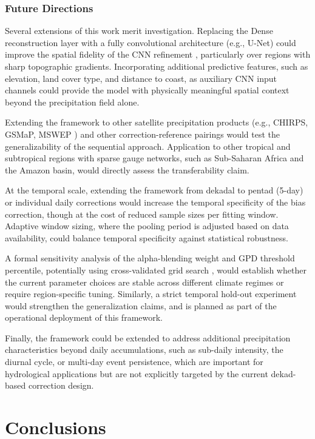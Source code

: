 \documentclass[remotesensing,article,submit,pdftex,moreauthors]{Definitions/mdpi}
\begin{document}
\subsubsection{Future Directions}\label{future-directions}

Several extensions of this work merit investigation. Replacing the Dense
reconstruction layer with a fully convolutional architecture (e.g.,
U-Net) could improve the spatial fidelity of the CNN refinement
\cite{ref40,ref41}, particularly over regions with sharp topographic gradients.
Incorporating additional predictive features, such as elevation, land
cover type, and distance to coast, as auxiliary CNN input channels could
provide the model with physically meaningful spatial context beyond the
precipitation field alone.

Extending the framework to other satellite precipitation products (e.g.,
CHIRPS, GSMaP, MSWEP \cite{ref42}) and other correction-reference pairings
would test the generalizability of the sequential approach. Application
to other tropical and subtropical regions with sparse gauge networks,
such as Sub-Saharan Africa and the Amazon basin, would directly assess
the transferability claim.

At the temporal scale, extending the framework from dekadal to pentad
(5-day) or individual daily corrections would increase the temporal
specificity of the bias correction, though at the cost of reduced sample
sizes per fitting window. Adaptive window sizing, where the pooling
period is adjusted based on data availability, could balance temporal
specificity against statistical robustness.

A formal sensitivity analysis of the alpha-blending weight and GPD
threshold percentile, potentially using cross-validated grid search
\cite{ref43}, would establish whether the current parameter choices are
stable across different climate regimes or require region-specific
tuning. Similarly, a strict temporal hold-out experiment would
strengthen the generalization claims, and is planned as part of the
operational deployment of this framework.

Finally, the framework could be extended to address additional
precipitation characteristics beyond daily accumulations, such as
sub-daily intensity, the diurnal cycle, or multi-day event persistence,
which are important for hydrological applications but are not explicitly
targeted by the current dekad-based correction design.

\section{Conclusions}\label{conclusions}
\end{document}

